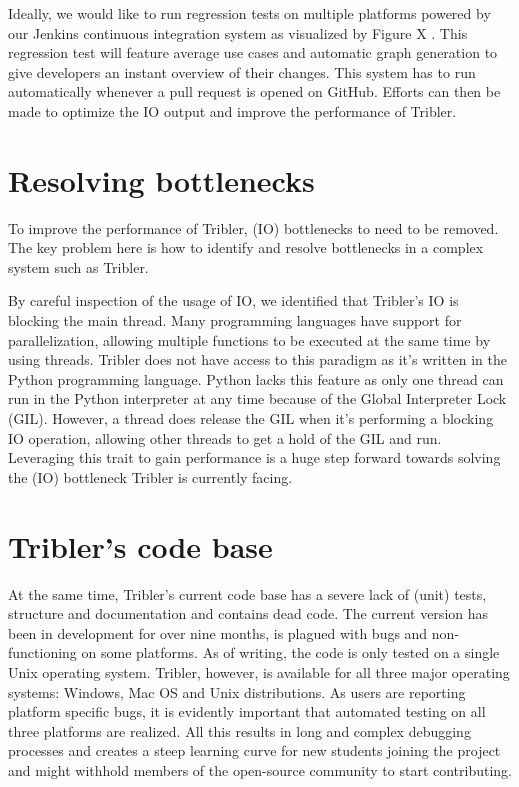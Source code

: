 Ideally, we would like to run regression tests on multiple platforms powered by our Jenkins continuous integration system as visualized by Figure X .
This regression test will feature average use cases and automatic graph generation to give developers an instant overview of their changes.
This system has to run automatically whenever a pull request is opened on GitHub.
Efforts can then be made to optimize the IO output and improve the performance of Tribler.

\section{Resolving bottlenecks}
To improve the performance of Tribler, (IO) bottlenecks to need to be removed.
The key problem here is how to identify and resolve bottlenecks in a complex system such as Tribler.

By careful inspection of the usage of IO, we identified that Tribler's IO is blocking the main thread.
Many programming languages have support for parallelization, allowing multiple functions to be executed at the same time by using threads.
Tribler does not have access to this paradigm as it's written in the Python programming language.
Python lacks this feature as only one thread can run in the Python interpreter at any time because of the Global Interpreter Lock (GIL).
However, a thread does release the GIL when it's performing a blocking IO operation, allowing other threads to get a hold of the GIL and run.
Leveraging this trait to gain performance is a huge step forward towards solving the (IO) bottleneck Tribler is currently facing.

\section{Tribler's code base}
At the same time, Tribler's current code base has a severe lack of (unit) tests, structure and documentation and contains dead code.
The current version has been in development for over nine months, is plagued with bugs and non-functioning on some platforms.
As of writing, the code is only tested on a single Unix operating system.
Tribler, however, is available for all three major operating systems: Windows, Mac OS and Unix distributions.
As users are reporting platform specific bugs, it is evidently important that automated testing on all three platforms are realized.
All this results in long and complex debugging processes and creates a steep learning curve for new students joining the project and might withhold members of the open-source community to start contributing.

